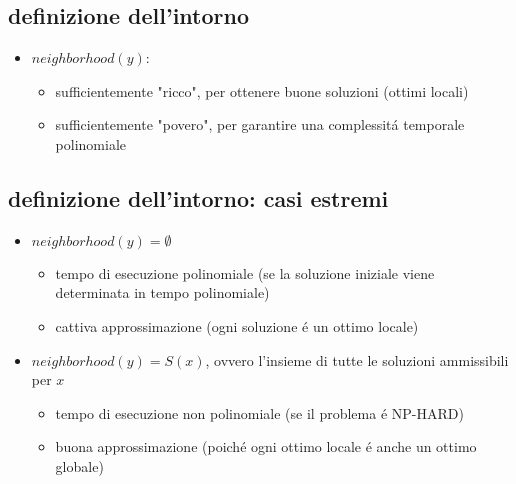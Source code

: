 \subsection*{definizione dell'intorno}
\begin{flushleft}
	\begin{itemize}
		\item $neighborhood(y)$:
		\begin{itemize}
			\item sufficientemente "ricco", per ottenere buone soluzioni (ottimi locali)
			\item sufficientemente "povero", per garantire una complessit\'a temporale polinomiale
		\end{itemize}
	\end{itemize}
\end{flushleft}


\subsection*{definizione dell'intorno: casi estremi}
\begin{flushleft}
	\begin{itemize}
		\item $neighborhood(y)=\emptyset$
		\begin{itemize}
			\item tempo di esecuzione polinomiale (se la soluzione iniziale viene determinata in tempo polinomiale)
			\item cattiva approssimazione (ogni soluzione \'e un ottimo locale)
		\end{itemize}
		\item $neighborhood(y)=S(x)$, ovvero l'insieme di tutte le soluzioni ammissibili per $x$
		\begin{itemize}
			\item tempo di esecuzione non polinomiale (se il problema \'e NP-HARD)
			\item buona approssimazione (poich\'e ogni ottimo locale \'e anche un ottimo globale)
		\end{itemize}
	\end{itemize}
\end{flushleft}


